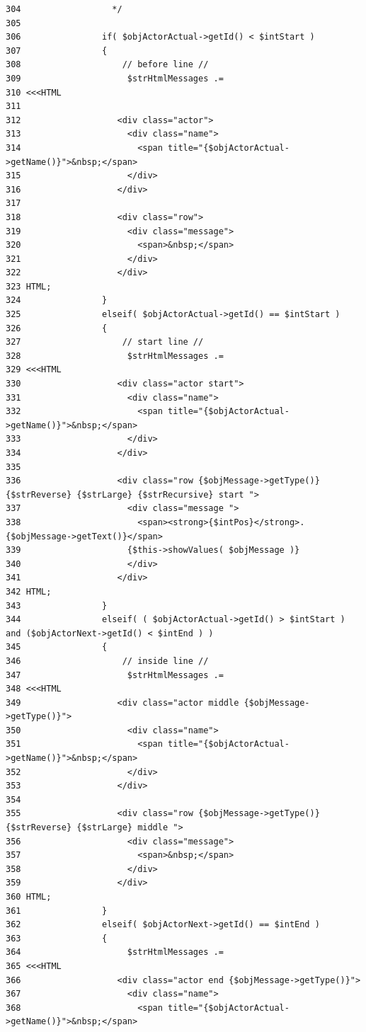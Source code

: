 \begin{Code}
\begin{verbatim}
304                  */
305 
306                if( $objActorActual->getId() < $intStart )
307                {
308                    // before line //
309                     $strHtmlMessages .=
310 <<<HTML
311 
312                   <div class="actor">
313                     <div class="name">
314                       <span title="{$objActorActual->getName()}">&nbsp;</span>
315                     </div>
316                   </div>
317 
318                   <div class="row">
319                     <div class="message">
320                       <span>&nbsp;</span>
321                     </div>
322                   </div>
323 HTML;
324                }
325                elseif( $objActorActual->getId() == $intStart )
326                {
327                    // start line //
328                     $strHtmlMessages .=
329 <<<HTML
330                   <div class="actor start">
331                     <div class="name">
332                       <span title="{$objActorActual->getName()}">&nbsp;</span>
333                     </div>
334                   </div>
335 
336                   <div class="row {$objMessage->getType()} {$strReverse} {$strLarge} {$strRecursive} start ">
337                     <div class="message ">
338                       <span><strong>{$intPos}</strong>. {$objMessage->getText()}</span>
339                     {$this->showValues( $objMessage )}
340                     </div>
341                   </div>
342 HTML;
343                }
344                elseif( ( $objActorActual->getId() > $intStart ) and ($objActorNext->getId() < $intEnd ) )
345                {
346                    // inside line //
347                     $strHtmlMessages .=
348 <<<HTML
349                   <div class="actor middle {$objMessage->getType()}">
350                     <div class="name">
351                       <span title="{$objActorActual->getName()}">&nbsp;</span>
352                     </div>
353                   </div>
354 
355                   <div class="row {$objMessage->getType()} {$strReverse} {$strLarge} middle ">
356                     <div class="message">
357                       <span>&nbsp;</span>
358                     </div>
359                   </div>
360 HTML;
361                }
362                elseif( $objActorNext->getId() == $intEnd )
363                {
364                     $strHtmlMessages .=
365 <<<HTML
366                   <div class="actor end {$objMessage->getType()}">
367                     <div class="name">
368                       <span title="{$objActorActual->getName()}">&nbsp;</span>

\end{verbatim}
\end{Code}
